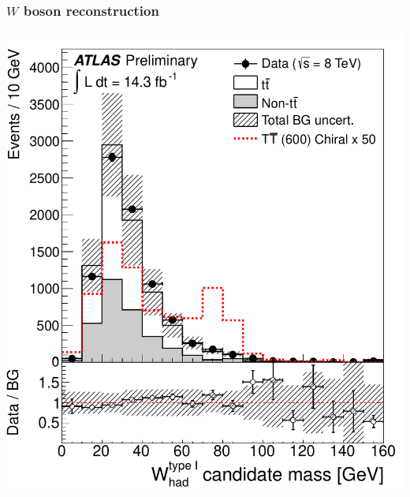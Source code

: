 \begin{frame}
\begin{minipage}{.75\textwidth}

\end{minipage}

\end{frame}

\begin{frame}\frametitle{$W$ boson reconstruction}
\centering\footnotesize

\begin{minipage}{.34\textwidth}\centering

{\cccolor \large \wi}

\includegraphics[width=1.\textwidth]{pics/VLQAna_WbX_WpreselType1_M_ELEMUON_preselW_NOMINAL}


\end{minipage}
\end{frame}
